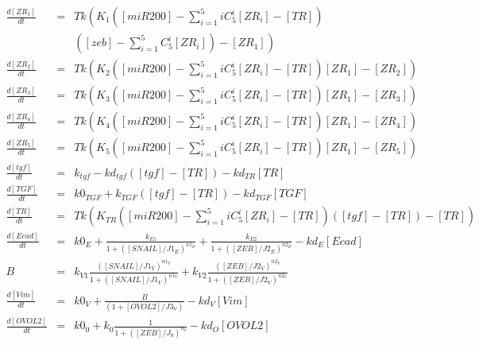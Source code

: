 \documentclass{article}
\begin{document}
{\begin{eqnarray*}
		\frac{d\left[ZR_{1}\right]}{dt} & = & Tk\left(K_{1}\left(\left[miR200\right]-\sum_{i=1}^{5}iC_{5}^{i}\left[ZR_{i}\right]-\left[TR\right]\right)\right.\\
		&  & \left.\left(\left[zeb\right]-\sum_{i=1}^{5}C_{5}^{i}\left[ZR_{i}\right]\right)-\left[ZR_{1}\right]\right)\\
		\frac{d\left[ZR_{2}\right]}{dt} & = & Tk\left(K_{2}\left(\left[miR200\right]-\sum_{i=1}^{5}iC_{5}^{i}\left[ZR_{i}\right]-\left[TR\right]\right)\left[ZR_{1}\right]-\left[ZR_{2}\right]\right)\\
		\frac{d\left[ZR_{3}\right]}{dt} & = & Tk\left(K_{3}\left(\left[miR200\right]-\sum_{i=1}^{5}iC_{5}^{i}\left[ZR_{i}\right]-\left[TR\right]\right)\left[ZR_{1}\right]-\left[ZR_{3}\right]\right)\\
		\frac{d\left[ZR_{4}\right]}{dt} & = & Tk\left(K_{4}\left(\left[miR200\right]-\sum_{i=1}^{5}iC_{5}^{i}\left[ZR_{i}\right]-\left[TR\right]\right)\left[ZR_{1}\right]-\left[ZR_{4}\right]\right)\\
		\frac{d\left[ZR_{5}\right]}{dt} & = & Tk\left(K_{5}\left(\left[miR200\right]-\sum_{i=1}^{5}iC_{5}^{i}\left[ZR_{i}\right]-\left[TR\right]\right)\left[ZR_{1}\right]-\left[ZR_{5}\right]\right)\\
		\frac{d\left[tgf\right]}{dt} & = & k_{tgf}-kd_{tgf}\left(\left[tgf\right]-\left[TR\right]\right)-kd_{TR}\left[TR\right]\\
		\frac{d\left[TGF\right]}{dt} & = & k0_{TGF}+k_{TGF}\left(\left[tgf\right]-\left[TR\right]\right)-kd_{TGF}\left[TGF\right]\\
		\frac{d\left[TR\right]}{dt} & = & Tk\left(K_{TR}\left(\left[miR200\right]-\sum_{i=1}^{5}iC_{5}^{i}\left[ZR_{i}\right]-\left[TR\right]\right)\left(\left[tgf\right]-\left[TR\right]\right)-\left[TR\right]\right)\\
		\frac{d\left[Ecad\right]}{dt} & = & k0_{E}+\frac{k_{E1}}{1+\left(\left[SNAIL\right]/J1_{E}\right)^{n1_{E}}}+\frac{k_{E2}}{1+\left(\left[ZEB\right]/J2_{E}\right)^{n2_{E}}}-kd_{E}\left[Ecad\right]\\
		B & = & k_{V1}\frac{\left(\left[SNAIL\right]/J1_{V}\right)^{n1_{V}}}{1+\left(\left[SNAIL\right]/J1_{V}\right)^{n1_{V}}}+k_{V2}\frac{\left(\left[ZEB\right]/J2_{V}\right)^{n2_{V}}}{1+\left(\left[ZEB\right]/J2_{V}\right)^{n2_{V}}}\\
		\frac{d\left[Vim\right]}{dt} & = & k0_{V}+\frac{B}{\left(1+\left[OVOL2\right]/J3_{V}\right)}-kd_{V}\left[Vim\right]\\
		\frac{d\left[OVOL2\right]}{dt} & = & k0_{0}+k_{0}\frac{1}{1+\left(\left[ZEB\right]/J_{0}\right)^{n_{0}}}-kd_{O}\left[OVOL2\right]\\

\end{eqnarray*}}
\end{document}
